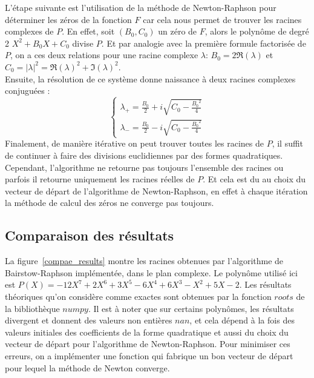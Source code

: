 \documentclass{article}
\begin{document}
L'étape suivante est l'utilisation de la méthode de Newton-Raphson pour déterminer les zéros de la fonction $F$ car cela nous permet de trouver les racines complexes de $P$. En effet, soit $(B_{0}, C_{0})$ un zéro de $F$, alors le polynôme de degré 2 $X^{2} + B_{0}X + C_{0}$ divise $P$. Et par analogie avec la première formule factorisée de $P$, on a ces deux relations pour une racine complexe $\lambda$: $B_{0} = 2\Re(\lambda)$ et $C_{0} = |\lambda|^{2} = {\Re(\lambda)}^{2} + {\Im(\lambda)}^{2}$. \\ Ensuite, la résolution de ce système donne naissance à deux racines complexes conjuguées :
\[\begin{cases}
\lambda_{+} = \frac{B_{0}}{2} + i\sqrt{C_{0} - \frac{{B_{0}}^{2}}{4}} \\
\lambda_{-}= \frac{B_{0}}{2} - i\sqrt{C_{0} - \frac{{B_{0}}^{2}}{4}}
\end{cases}
\]
Finalement, de manière itérative on peut trouver toutes les racines de $P$, il suffit de continuer à faire des divisions euclidiennes par des formes quadratiques. Cependant, l'algorithme ne retourne pas toujours l'ensemble des racines ou parfois il retourne uniquement les racines réelles de $P$. Et cela est du au choix du vecteur de départ de l'algorithme de Newton-Raphson, en effet à chaque itération la méthode de calcul des zéros ne converge pas toujours.

\subsection{Comparaison des résultats}
La figure~\ref{compae_results} montre les racines obtenues par l'algorithme de Bairstow-Raphson implémentée, dans le plan complexe. Le polynôme utilisé ici est $P(X)=-12X^{7} + 2X^{6} + 3X^{5} -6X^{4}+ 6X^{3} -X^{2} + 5X -2$. Les résultats théoriques qu'on considère comme exactes sont obtenues par la fonction $roots$ de la bibliothèque $numpy$.
Il est à noter que sur certains polynômes, les résultats divergent et donnent des valeurs non entières $nan$, et cela dépend à la fois des valeurs initiales des coefficients de la forme quadratique et aussi du choix du vecteur de départ pour l'algorithme de Newton-Raphson. Pour minimiser ces erreurs, on a implémenter une fonction qui fabrique un bon vecteur de départ pour lequel la méthode de Newton converge.
\end{document}
